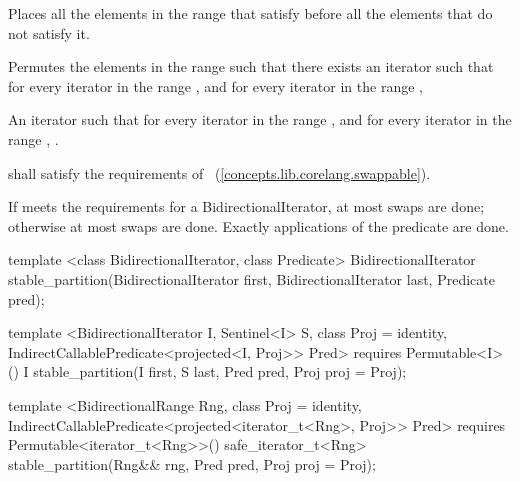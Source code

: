\begin{itemdescr}
\pnum
\begin{removedblock}
\effects Places all the elements in the range  that satisfy
 before all the elements that do not satisfy it.
\end{removedblock}

\begin{addedblock}
\effects Permutes the elements in the range  such that there exists an iterator 
such that for every iterator  in the range 
, and for every iterator  in the
range , 
\end{addedblock}

\pnum
\returns An iterator  such that for every iterator  in the range 
,
and for every iterator  in the range ,
.

\begin{removedblock}
\pnum
\requires
{} shall satisfy the requirements of
~(\ref{concepts.lib.corelang.swappable}).
\end{removedblock}

\pnum
\complexity If  meets the requirements for a BidirectionalIterator, at most
 swaps are done; otherwise at most  swaps
are done. Exactly  applications of the predicate are done.
\end{itemdescr}

%
\begin{removedblock}
\begin{itemdecl}
template <class BidirectionalIterator, class Predicate>
  BidirectionalIterator
    stable_partition(BidirectionalIterator first,
                     BidirectionalIterator last, Predicate pred);
\end{itemdecl}
\end{removedblock}
\begin{addedblock}
\begin{itemdecl}
template <BidirectionalIterator I, Sentinel<I> S, class Proj = identity,
    IndirectCallablePredicate<projected<I, Proj>> Pred>
  requires Permutable<I>()
  I stable_partition(I first, S last, Pred pred, Proj proj = Proj{});

template <BidirectionalRange Rng, class Proj = identity,
    IndirectCallablePredicate<projected<iterator_t<Rng>, Proj>> Pred>
  requires Permutable<iterator_t<Rng>>()
  safe_iterator_t<Rng>
    stable_partition(Rng&& rng, Pred pred, Proj proj = Proj{});
\end{itemdecl}
\end{addedblock}

